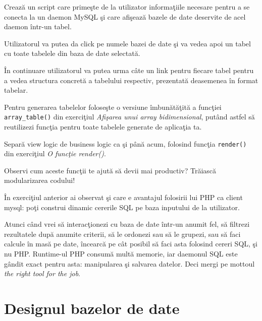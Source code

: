 \begin{Exercise}[title={Databases explorer}]
Crează un script care primeşte de la utilizator informaţiile necesare
pentru a se conecta la un daemon MySQL şi care afişează bazele
de date deservite de acel daemon într-un tabel.

Utilizatorul va putea da click pe numele bazei de date şi va vedea
apoi un tabel cu toate tabelele din baza de date selectată.

În continuare utilizatorul va putea urma câte un link pentru fiecare
tabel pentru a vedea structura concretă a tabelului respectiv,
prezentată deasemenea în format tabelar.

Pentru generarea tabelelor foloseşte o versiune îmbunătăţită a funcţiei
\texttt{array\_table()} din exerciţiul \textit{Afişarea unui array
bidimensional}, putând astfel să reutilizezi funcţia pentru
toate tabelele generate de aplicaţia ta.

Separă view logic de business logic ca şi până acum, folosind funcţia
\texttt{render()} din exerciţiul \textit{O funcţie render()}.

Observi cum aceste funcţii te ajută să devii mai productiv? Trăiască
modularizarea codului!
\end{Exercise}

În exerciţiul anterior ai observat şi care e avantajul folosirii lui
PHP ca client mysql: poţi construi dinamic cererile SQL pe baza
inputului de la utilizator.

Atunci când vrei să interacţionezi cu baza de date într-un anumit fel,
să filtrezi rezultatele după anumite criterii, să le ordonezi sau să
le grupezi, sau să faci calcule în masă pe date, încearcă pe cât posibil
să faci asta folosind cereri SQL, şi nu PHP. Runtime-ul PHP consumă
multă memorie, iar daemonul SQL este gândit exact pentru asta: manipularea
şi salvarea datelor. Deci mergi pe mottoul \textsl{the right tool for
the job}.


\section{Designul bazelor de date}




